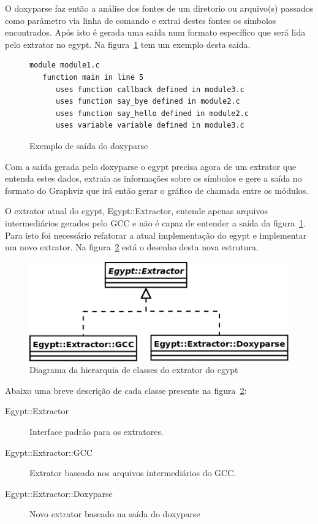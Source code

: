 O doxyparse faz então a análise dos fontes de um diretorio ou arquivo(s)
passados como parâmetro via linha de comando e extrai destes fontes os símbolos
encontrados. Após isto é gerada uma saída num formato específico que será lida
pelo extrator no egypt. Na figura~\ref{exemplo-saida-doxyparse} tem um exemplo
desta saída.

\begin{figure}[h]
\begin{Verbatim}[frame=single,fontsize=\relsize{-2},fontfamily=courier]
module module1.c
   function main in line 5
      uses function callback defined in module3.c
      uses function say_bye defined in module2.c
      uses function say_hello defined in module2.c
      uses variable variable defined in module3.c
\end{Verbatim}
\caption{Exemplo de saída do doxyparse}
\label{exemplo-saida-doxyparse}
\end{figure}

Com a saída gerada pelo doxyparse o egypt precisa agora de um extrator que
entenda estes dados, extraia as informações sobre os símbolos e gere a saída no
formato do Graphviz que irá então gerar o gráfico de chamada entre os módulos.

O extrator atual do egypt, Egypt::Extractor, entende apenas arquivos
intermediários gerados pelo GCC e não é capaz de entender a saída da
figura~\ref{exemplo-saida-doxyparse}. Para isto foi necessário refatorar a
atual implementação do egypt e implementar um novo extrator. Na
figura~\ref{egypt-diagram-extractor} está o desenho desta nova estrutura.

\begin{figure}[h]
\center
\includegraphics[scale=0.4]{imagens/egypt-diagram-extractor}
\caption{Diagrama da hierarquia de classes do extrator do egypt}
\label{egypt-diagram-extractor}
\end{figure}

Abaixo uma breve descrição de cada classe presente na
figura~\ref{egypt-diagram-extractor}:

\begin{description}
\item[Egypt::Extractor] Interface padrão para os extratores.
\item[Egypt::Extractor::GCC] Extrator baseado nos arquivos intermediários do GCC.
\item[Egypt::Extractor::Doxyparse] Novo extrator baseado na saída do doxyparse
\end{description}

